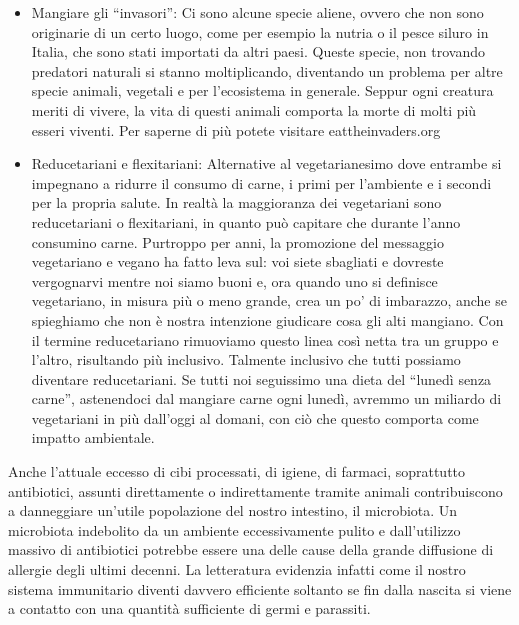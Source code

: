 \documentclass[12pt]{book} %
\begin{document}
\begin{itemize}
\item Mangiare gli “invasori”: Ci sono alcune specie aliene, ovvero che non sono originarie di un certo luogo, come
per esempio la nutria o il pesce siluro in Italia, che sono stati importati da altri paesi. Queste specie, non
trovando predatori naturali si stanno moltiplicando, diventando un problema per altre specie animali, vegetali e
per l'ecosistema in generale. Seppur ogni creatura meriti di vivere, la vita di questi
animali comporta la morte di molti più esseri viventi. Per saperne di più potete visitare eattheinvaders.org
\item Reducetariani e flexitariani: Alternative al vegetarianesimo dove entrambe si impegnano a ridurre il consumo di carne, i primi per l'ambiente e i secondi per la propria salute. In realtà la maggioranza dei vegetariani sono reducetariani o flexitariani, in quanto può capitare che durante l'anno consumino carne. Purtroppo per anni, la promozione del
messaggio vegetariano e vegano ha fatto leva sul: voi siete sbagliati e dovreste vergognarvi mentre noi siamo buoni e,
ora quando uno si definisce vegetariano, in misura più o meno grande, crea un po' di imbarazzo, anche se
spieghiamo che non è nostra intenzione giudicare cosa gli alti mangiano. Con il termine reducetariano rimuoviamo questo
linea così netta tra un gruppo e l'altro, risultando più inclusivo. Talmente inclusivo che tutti
possiamo diventare reducetariani. Se tutti noi seguissimo una dieta del “lunedì senza carne”, astenendoci dal mangiare
carne ogni lunedì, avremmo un miliardo di vegetariani in più dall'oggi al domani, con ciò che questo comporta come impatto ambientale.
\end{itemize}

\begin{mdframed}[linewidth=1pt]
Anche l'attuale eccesso di cibi processati, di igiene, di farmaci, soprattutto antibiotici, assunti
direttamente o indirettamente tramite animali contribuiscono a danneggiare un'utile popolazione
del nostro intestino, il microbiota. Un microbiota indebolito da un ambiente eccessivamente pulito e
dall'utilizzo massivo di antibiotici potrebbe essere una delle cause della grande diffusione di
allergie degli ultimi decenni. La letteratura evidenzia infatti come il nostro sistema immunitario diventi davvero
efficiente soltanto se fin dalla nascita si viene a contatto con una quantità sufficiente di germi e parassiti. 
\end{mdframed}
\end{document}
